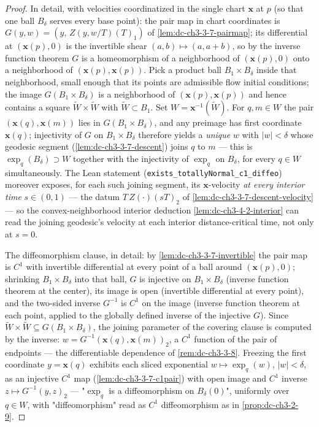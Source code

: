 \begin{proof}
  In detail, with velocities coordinatized in the single chart $\mathbf{x}$ at
  $p$ (so that one ball $B_\delta$ serves every base point): the pair map in
  chart coordinates is $G(y,w)=(y,\,Z(y,w/T)(T)_1)$ of
  \cref{lem:dc-ch3-3-7-pairmap}; its differential at $(\mathbf{x}(p),0)$ is the
  invertible shear $(a,b)\mapsto(a,a+b)$, so by the inverse function theorem $G$
  is a homeomorphism of a neighborhood of $(\mathbf{x}(p),0)$ onto a
  neighborhood of $(\mathbf{x}(p),\mathbf{x}(p))$. Pick a product ball
  $B_1\times B_\delta$ inside that neighborhood, small enough that its points
  are admissible flow initial conditions; the image $G(B_1\times B_\delta)$ is
  a neighborhood of $(\mathbf{x}(p),\mathbf{x}(p))$ and hence contains a square
  $\widetilde W\times\widetilde W$ with
  $\widetilde W\subset B_1$. Set $W=\mathbf{x}^{-1}(\widetilde W)$. For
  $q,m\in W$ the pair $(\mathbf{x}(q),\mathbf{x}(m))$ lies in
  $G(B_1\times B_\delta)$, and any preimage has first coordinate
  $\mathbf{x}(q)$; injectivity of $G$ on $B_1\times B_\delta$ therefore yields a
  \emph{unique} $w$ with $|w|<\delta$ whose geodesic segment
  (\cref{lem:dc-ch3-3-7-descent}) joins $q$ to $m$ — this is
  $\exp_q(B_\delta)\supset W$ together with the injectivity of $\exp_q$ on
  $B_\delta$, for every $q\in W$ simultaneously. The Lean statement
  (\texttt{exists\_totallyNormal\_c1\_diffeo}) moreover exposes, for each such
  joining segment, its $\mathbf{x}$-velocity \emph{at every interior time}
  $s\in(0,1)$ — the datum $T\,Z(\cdot)(sT)_2$ of
  \cref{lem:dc-ch3-3-7-descent-velocity} — so the convex-neighborhood interior
  deduction \cref{lem:dc-ch3-4-2-interior} can read the joining geodesic's
  velocity at each interior distance-critical time, not only at $s=0$.

  The diffeomorphism clause, in detail: by \cref{lem:dc-ch3-3-7-invertible}
  the pair map is $C^1$ with invertible differential at every point of a ball
  around $(\mathbf{x}(p),0)$; shrinking $B_1\times B_\delta$ into that ball,
  $G$ is injective on $B_1\times B_\delta$ (inverse function theorem at the
  center), its image is open (invertible differential at every point), and
  the two-sided inverse $G^{-1}$ is $C^1$ on the image (inverse function
  theorem at each point, applied to the globally defined inverse of the
  injective $G$). Since $\widetilde W\times\widetilde W\subseteq
  G(B_1\times B_\delta)$, the joining parameter of the covering clause is
  computed by the inverse: $w=G^{-1}(\mathbf{x}(q),\mathbf{x}(m))_2$, a $C^1$
  function of the pair of endpoints — the differentiable dependence of
  \cref{rem:dc-ch3-3-8}. Freezing the first coordinate $y=\mathbf{x}(q)$
  exhibits each sliced exponential $w\mapsto\exp_q(w)$, $|w|<\delta$, as an
  injective $C^1$ map (\cref{lem:dc-ch3-3-7-c1pair}) with open image and
  $C^1$ inverse $z\mapsto G^{-1}(y,z)_2$ — "$\exp_q$ is a diffeomorphism on
  $B_\delta(0)$", uniformly over $q\in W$, with "diffeomorphism" read as
  $C^1$ diffeomorphism as in \cref{prop:dc-ch3-2-9}.
\end{proof}

